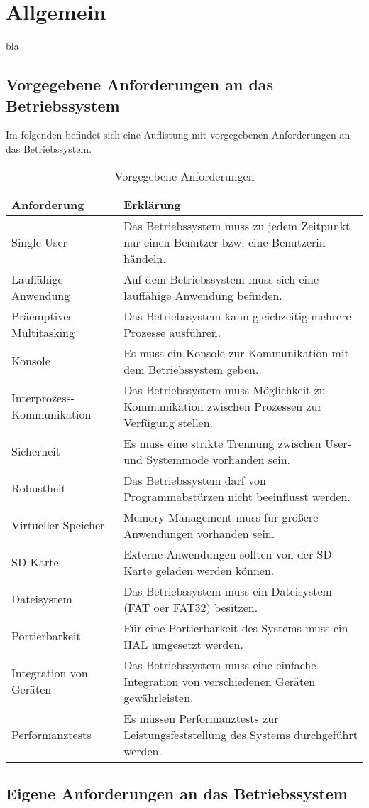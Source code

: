 \section{Allgemein}
bla

\subsection{Vorgegebene Anforderungen an das Betriebssystem}
Im folgenden befindet sich eine Auflistung mit vorgegebenen Anforderungen an das Betriebssystem.

\begin{table}[H]
\begin{tabular}{ p{5cm}| p{9cm} }
  \textbf{Anforderung} & \textbf{Erklärung} \\ 
  \hline
  Single-User & Das Betriebssystem muss zu jedem Zeitpunkt nur einen Benutzer bzw. eine Benutzerin händeln. \\
  Lauffähige Anwendung & Auf dem Betriebssystem muss sich eine lauffähige Anwendung befinden. \\
  Präemptives Multitasking & Das Betriebssystem kann gleichzeitig mehrere Prozesse ausführen.\\
  Konsole & Es muss ein Konsole zur Kommunikation mit dem Betriebssystem geben. \\
  Interprozess-Kommunikation & Das Betriebssystem muss Möglichkeit zu Kommunikation zwischen Prozessen zur Verfügung stellen. \\
  Sicherheit & Es muss eine strikte Trennung zwischen User- und Systemmode vorhanden sein. \\
  Robustheit & Das Betriebssystem darf von Programmabstürzen nicht beeinflusst werden. \\
  Virtueller Speicher & Memory Management muss für größere Anwendungen vorhanden sein. \\
  SD-Karte & Externe Anwendungen sollten von der SD-Karte geladen werden können. \\
  Dateisystem & Das Betriebssystem muss ein Dateisystem (FAT oer FAT32) besitzen. \\
  Portierbarkeit & Für eine Portierbarkeit des Systems muss ein HAL umgesetzt werden. \\
  Integration von Geräten & Das Betriebssystem muss eine einfache Integration von verschiedenen Geräten gewährleisten. \\
  Performanztests & Es müssen Performanztests zur Leistungsfeststellung des Systems durchgeführt werden. \\  
 \end{tabular}
 \caption{Vorgegebene Anforderungen}
 \label{table:Prescribed-Requirements}
\end{table}

\subsection{Eigene Anforderungen an das Betriebssystem}
\pagebreak 